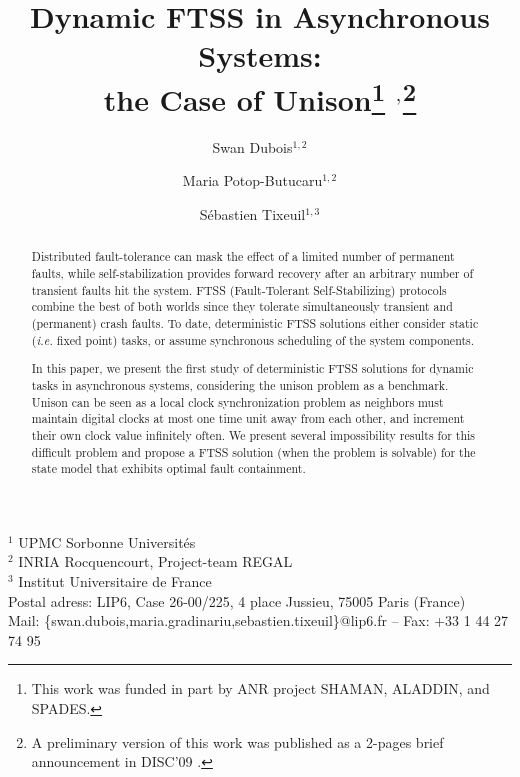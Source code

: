 \documentclass[11pt,english,letterpaper]{article}
\date{}
\begin{document}
\title{Dynamic FTSS in Asynchronous Systems: \\the Case of Unison\protect\footnote{This work was funded in part by ANR project SHAMAN, ALADDIN, and SPADES.} $^,$\footnote{A preliminary version of this work was published as a 2-pages brief announcement in DISC'09 \cite{DPT09ca}.}}

\author{
Swan Dubois$^{1,2}$ \and Maria Potop-Butucaru$^{1,2}$ \and S\'ebastien Tixeuil$^{1,3}$}

\maketitle

\vspace{-0.75cm}

\begin{center}
\scriptsize{
 $^{1}$ UPMC Sorbonne Universit\'es\\
 $^{2}$ INRIA Rocquencourt, Project-team REGAL\\
 $^{3}$ Institut Universitaire de France\\
 Postal adress: LIP6, Case 26-00/225, 4 place Jussieu, 75005 Paris (France)\\
 Mail: \{swan.dubois,maria.gradinariu,sebastien.tixeuil\}@lip6.fr -- Fax: +33 1 44 27 74 95 
}
\end{center}

\begin{abstract}
Distributed fault-tolerance can mask the effect of a limited number of permanent faults, while self-stabilization provides forward recovery after an arbitrary number of transient faults hit the system. FTSS (Fault-Tolerant Self-Stabilizing) protocols combine the best of both worlds since they tolerate simultaneously transient and (permanent) crash faults. To date, deterministic FTSS solutions either consider static (\emph{i.e.} fixed point) tasks, or assume synchronous scheduling of the system components. 

In this paper, we present the first study of deterministic FTSS solutions for dynamic tasks in asynchronous systems, considering the unison problem as a benchmark. Unison can be seen as a local clock synchronization problem as neighbors must maintain digital clocks at most one time unit away from each other, and increment their own clock value infinitely often. We present several impossibility results for this difficult problem and propose a FTSS solution (when the problem is solvable) for the state model that exhibits optimal fault containment.
\end{abstract}
\end{document}
